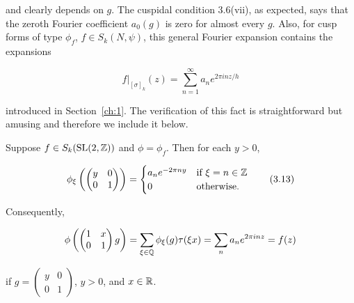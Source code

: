 \begin{remark}
and clearly depends on $g$. The cuspidal condition 3.6(vii), as expected, says that the zeroth Fourier coefficient $a_0(g)$ is zero for almost every $g$. Also, for cusp forms of type $\phi_f$, $f \in S_k(N,\psi)$, this general Fourier expansion contains the expansions

\begin{equation}\label{eq:3.12}
f\big|_{[\sigma]_k}(z) = \sum_{n=1}^{\infty}a_n e^{2\pi inz/h}\tag{3.12}
\end{equation}

introduced in Section~\ref{ch:1}. The verification of this fact is straightforward but amusing and therefore we include it below.

\end{remark}

\begin{lemma}\label{lem:3.6}

Suppose $f \in S_k(\operatorname{SL}(2,\mathbb{Z}))$ and $\phi = \phi_f$. Then for each $y > 0$,

\begin{equation}\label{eq:3.13}
\phi_\xi\left(\begin{pmatrix} y & 0 \\ 0 & 1 \end{pmatrix}\right) = \begin{cases} a_n e^{-2\pi ny} & \text{if } \xi = n \in \mathbb{Z} \\ 0 & \text{otherwise.} \end{cases}\tag{3.13}
\end{equation}

Consequently,

\[
\phi\left(\begin{pmatrix} 1 & x \\ 0 & 1 \end{pmatrix}g\right) = \sum_{\xi\in\mathbb{Q}}\phi_\xi(g)\tau(\xi x) = \sum_n a_n e^{2\pi inz} = f(z)
\]

if $g = \begin{pmatrix} y & 0 \\ 0 & 1 \end{pmatrix}$, $y > 0$, and $x \in \mathbb{R}$.

\end{lemma}

